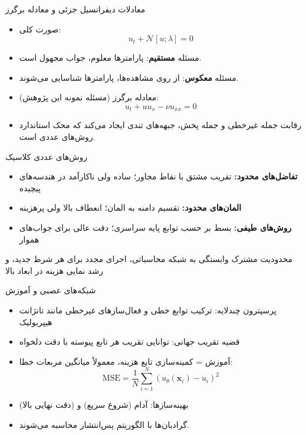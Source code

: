 \documentclass[12pt,aspectratio=169]{beamer}
\begin{document}
\begin{frame}{معادلات دیفرانسیل جزئی و معادله برگرز}
\begin{itemize}
\item صورت کلی:
\begin{equation*}
u_t + \mathcal{N}[u; \lambda] = 0
\end{equation*}
\item مسئله \textbf{مستقیم}: پارامترها معلوم، جواب مجهول است.
\item مسئله \textbf{معکوس}: از روی مشاهده‌ها، پارامترها شناسایی می‌شوند.
\item معادله برگرز (مسئله نمونه این پژوهش):
\begin{equation*}
u_t + u u_x - \nu u_{xx} = 0
\end{equation*}
\item رقابت جمله غیرخطی و جمله پخش، جبهه‌های تندی ایجاد می‌کند که محک استاندارد روش‌های عددی است.
\end{itemize}
\end{frame}

\begin{frame}{روش‌های عددی کلاسیک}
\begin{itemize}
\item \textbf{تفاضل‌های محدود:} تقریب مشتق با نقاط مجاور؛ ساده ولی ناکارآمد در هندسه‌های پیچیده
\item \textbf{المان‌های محدود:} تقسیم دامنه به المان؛ انعطاف بالا ولی پرهزینه
\item \textbf{روش‌های طیفی:} بسط بر حسب توابع پایه سراسری؛ دقت عالی برای جواب‌های هموار
\end{itemize}
\vspace{3mm}
\begin{block}{محدودیت مشترک}
وابستگی به شبکه محاسباتی، اجرای مجدد برای هر شرط جدید، و رشد نمایی هزینه در ابعاد بالا
\end{block}
\end{frame}

\begin{frame}{شبکه‌های عصبی و آموزش}
\begin{itemize}
\item پرسپترون چندلایه: ترکیب توابع خطی و فعال‌سازهای غیرخطی مانند تانژانت هیپربولیک
\item قضیه تقریب جهانی: توانایی تقریب هر تابع پیوسته با دقت دلخواه
\item آموزش = کمینه‌سازی تابع هزینه، معمولاً میانگین مربعات خطا:
\begin{equation*}
\mathrm{MSE} = \frac{1}{N}\sum_{i=1}^{N} (u_\theta(\mathbf{x}_i) - u_i)^2
\end{equation*}
\item بهینه‌سازها: آدام (شروع سریع) و  (دقت نهایی بالا)
\item گرادیان‌ها با الگوریتم پس‌انتشار محاسبه می‌شوند.
\end{itemize}
\end{frame}
\end{document}

